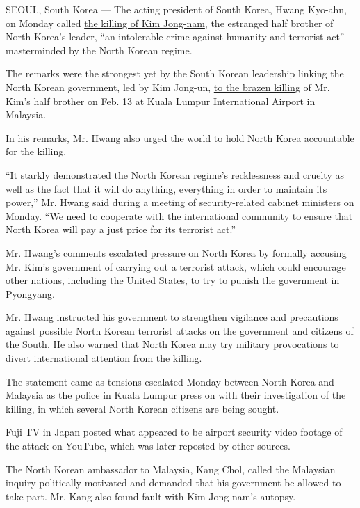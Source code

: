 SEOUL, South Korea --- The acting president of South Korea, Hwang
Kyo-ahn, on Monday called
\href{https://www.nytimes3xbfgragh.onion/2017/02/15/world/asia/kim-jong-nam-assassination-north-korea.html}{the
killing of Kim Jong-nam}, the estranged half brother of North Korea's
leader, ``an intolerable crime against humanity and terrorist act''
masterminded by the North Korean regime.

The remarks were the strongest yet by the South Korean leadership
linking the North Korean government, led by Kim Jong-un,
\href{https://www.nytimes3xbfgragh.onion/2017/02/14/world/asia/kim-jong-un-brother-killed-malaysia.html}{to
the brazen killing} of Mr. Kim's half brother on Feb. 13 at Kuala Lumpur
International Airport in Malaysia.

In his remarks, Mr. Hwang also urged the world to hold North Korea
accountable for the killing.

``It starkly demonstrated the North Korean regime's recklessness and
cruelty as well as the fact that it will do anything, everything in
order to maintain its power,'' Mr. Hwang said during a meeting of
security-related cabinet ministers on Monday. ``We need to cooperate
with the international community to ensure that North Korea will pay a
just price for its terrorist act.''

Mr. Hwang's comments escalated pressure on North Korea by formally
accusing Mr. Kim's government of carrying out a terrorist attack, which
could encourage other nations, including the United States, to try to
punish the government in Pyongyang.

Mr. Hwang instructed his government to strengthen vigilance and
precautions against possible North Korean terrorist attacks on the
government and citizens of the South. He also warned that North Korea
may try military provocations to divert international attention from the
killing.

The statement came as tensions escalated Monday between North Korea and
Malaysia as the police in Kuala Lumpur press on with their investigation
of the killing, in which several North Korean citizens are being sought.

Fuji TV in Japan posted what appeared to be airport security video
footage of the attack on YouTube, which was later reposted by other
sources.

The North Korean ambassador to Malaysia, Kang Chol, called the Malaysian
inquiry politically motivated and demanded that his government be
allowed to take part. Mr. Kang also found fault with Kim Jong-nam's
autopsy.

